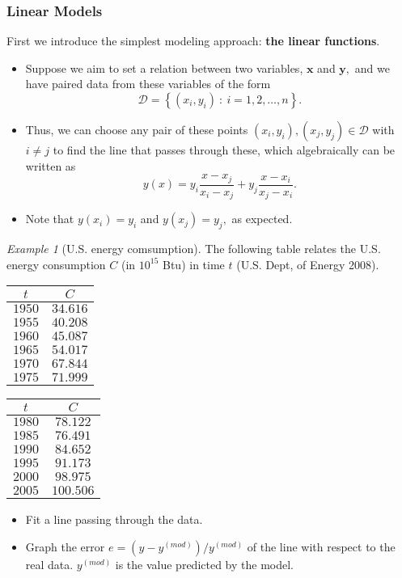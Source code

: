 \documentclass[xcolor=svgnames, t]{beamer}
\theoremstyle{definition}
\theoremstyle{plain}
\theoremstyle{remark}
\newtheorem{ex}{Example}
\begin{document}
\begin{frame}[allowframebreaks]
	\frametitle{Linear Models}
	First we introduce the simplest modeling approach: \textbf{the linear functions}.
\begin{itemize}
	\item  Suppose we aim to set a relation between two variables, $ \textbf{x} $ and $ \textbf{y}, $ and we have paired data from these variables of the form
	$$ \mathcal{D} = \left\{ (x_i,y_i) \ :\ i=1,2,\dots,n  \right\} . $$ 
\item Thus, we can choose any pair of these points $ (x_i,y_i), (x_j,y_j)\in \mathcal{D} $ with $ i\neq j $ to find the line that passes through these, which algebraically can be written as
	$$ y(x) = y_i \frac{x-x_j}{x_i-x_j} + y_j \frac{x-x_i}{x_j-x_i}. $$ 
\item Note that $ y(x_i)=y_i $ and $ y(x_j)=y_j, $ as expected. 
\end{itemize}

\begin{ex}[U.S. energy comsumption]
	The following table relates the U.S. energy consumption $ C $ (in $ 10^15 $ Btu) in time $ t $ (U.S. Dept, of Energy 2008).
	\begin{table}[h]
		\centering
		\label{tab:energy}
	
		\begin{tabular}{cc}
			\hline
			$ t $ & $ C $ \\ \hline
			$ 1950 $ & $ 34.616 $ \\
			$ 1955 $ & $ 40.208 $ \\
			$ 1960 $ & $ 45.087 $ \\
			$ 1965 $ & $ 54.017 $ \\
			$ 1970 $ & $ 67.844 $ \\
			$ 1975 $ & $ 71.999 $ \\
		\end{tabular}
		\begin{tabular}{cc}
			\hline
			$ t $ & $ C $ \\ \hline
			$ 1980 $ & $ 78.122 $ \\
			$ 1985 $ & $ 76.491 $ \\
			$ 1990 $ & $ 84.652 $ \\
			$ 1995 $ & $ 91.173 $ \\
			$ 2000 $ & $ 98.975 $ \\
			$ 2005 $ & $ 100.506 $ \\
		\end{tabular}
\begin{itemize}
	\item Fit a line passing through the data.
	\item Graph the error $ e= (y -y^{(mod)})/y^{(mod)}$  of the line with respect to the real data. $ y^{(mod)} $ is the value predicted by the model.
\end{itemize}
	\end{table}
\end{ex}
\end{frame}
\end{document}
